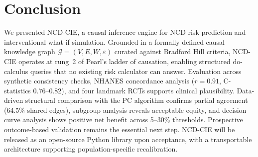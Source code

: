 \documentclass[runningheads]{llncs}
\begin{document}
\section{Conclusion}\label{sec:conclusion}

We presented NCD-CIE, a causal inference engine for NCD risk
prediction and interventional what-if simulation.  Grounded in a
formally defined causal knowledge graph
$\mathcal{G} = (V, E, W, \varepsilon)$ curated against Bradford Hill
criteria, NCD-CIE operates at rung~2 of Pearl's ladder of causation,
enabling structured do-calculus queries that no existing risk
calculator can answer.  Evaluation across synthetic consistency checks,
NHANES concordance analysis ($r = 0.91$, C-statistics 0.76--0.82),
and four landmark RCTs supports clinical plausibility.  Data-driven
structural comparison with the PC algorithm confirms partial agreement
(64.5\% shared edges), subgroup analysis reveals acceptable equity,
and decision curve analysis shows positive net benefit across 5--30\%
thresholds.  Prospective outcome-based validation remains the
essential next step.  NCD-CIE will be released as an open-source
Python library upon acceptance, with a transportable architecture
supporting population-specific recalibration.
\end{document}
